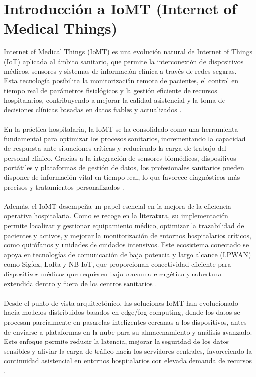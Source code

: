 \section{Introducción a IoMT (Internet of Medical Things)}
Internet of Medical Things (IoMT) es una evolución natural de Internet of Things (IoT) aplicada al ámbito sanitario, que permite la interconexión de dispositivos médicos, 
sensores y sistemas de información clínica a través de redes seguras. Esta tecnología posibilita la monitorización remota de pacientes, el control en tiempo real de 
parámetros fisiológicos y la gestión eficiente de recursos hospitalarios, contribuyendo a mejorar la calidad asistencial y la toma de decisiones clínicas basadas en datos 
fiables y actualizados \cite{articulo2} \cite{articulo3}. \\ \\

En la práctica hospitalaria, la \ac{IoMT} se ha consolidado como una herramienta fundamental para optimizar los procesos sanitarios, incrementando la capacidad de respuesta ante situaciones
críticas y reduciendo la carga de trabajo del personal clínico. Gracias a la integración de sensores biomédicos, dispositivos portátiles y plataformas de gestión de datos, 
los profesionales sanitarios pueden disponer de información vital en tiempo real, lo que favorece diagnósticos más precisos y tratamientos personalizados \cite{articulo3}. \\ \\

Además, el IoMT desempeña un papel esencial en la mejora de la eficiencia operativa hospitalaria. Como se recoge en la literatura, su implementación permite localizar y gestionar
equipamiento médico, optimizar la trazabilidad de pacientes y activos, y mejorar la monitorización de entornos hospitalarios críticos, como quirófanos y unidades de cuidados intensivos.
Este ecosistema conectado se apoya en tecnologías de comunicación de baja potencia y largo alcance (\ac{LPWAN}) como Sigfox, \ac{LoRa} y \ac{NB-IoT}, que proporcionan conectividad eficiente para
dispositivos médicos que requieren bajo consumo energético y cobertura extendida dentro y fuera de los centros sanitarios \cite{articulo2}. \\ \\

Desde el punto de vista arquitectónico, las soluciones IoMT han evolucionado hacia modelos distribuidos basados en edge/fog computing, donde los datos se procesan parcialmente
en pasarelas inteligentes cercanas a los dispositivos, antes de enviarse a plataformas en la nube para su almacenamiento y análisis avanzado. Este enfoque permite reducir la 
latencia, mejorar la seguridad de los datos sensibles y aliviar la carga de tráfico hacia los servidores centrales, favoreciendo la continuidad asistencial en entornos hospitalarios
con elevada demanda de recursos \cite{articulo1} \cite{articulo3}. \\ \\

